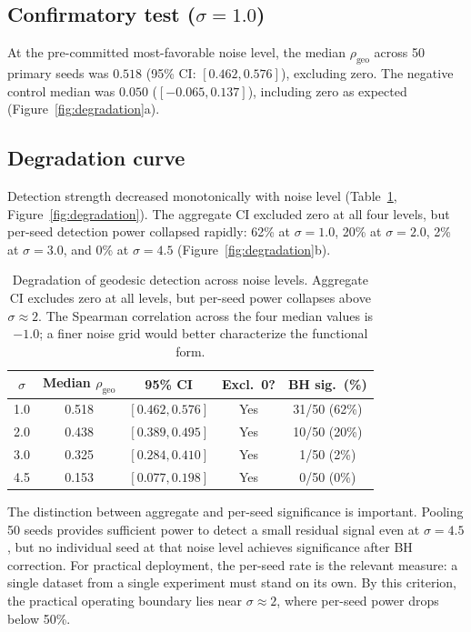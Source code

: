 \documentclass[11pt]{article}
\newcommand{\rhogeo}{\rho_\mathrm{geo}}
\begin{document}
\subsection{Confirmatory test ($\sigma = 1.0$)}

At the pre-committed most-favorable noise level, the median
$\rhogeo$ across 50 primary seeds was $0.518$ (95\% CI: $[0.462,
0.576]$), excluding zero.  The negative control median was $0.050$
($[-0.065, 0.137]$), including zero as expected
(Figure~\ref{fig:degradation}a).

\subsection{Degradation curve}

Detection strength decreased monotonically with noise level
(Table~\ref{tab:degradation}, Figure~\ref{fig:degradation}).  The
aggregate CI excluded zero at all four levels, but per-seed
detection power collapsed rapidly: 62\% at $\sigma = 1.0$, 20\%
at $\sigma = 2.0$, 2\% at $\sigma = 3.0$, and 0\% at
$\sigma = 4.5$ (Figure~\ref{fig:degradation}b).

\begin{table}[t]
\centering
\caption{Degradation of geodesic detection across noise levels.
  Aggregate CI excludes zero at all levels, but per-seed power
  collapses above $\sigma \approx 2$.  The Spearman correlation
  across the four median values is $-1.0$; a finer noise grid
  would better characterize the functional form.}
\label{tab:degradation}
\begin{tabular}{@{}ccccc@{}}
\toprule
$\sigma$ & Median $\rhogeo$ & 95\% CI & Excl.\ 0? & BH sig.\ (\%) \\
\midrule
1.0 & 0.518 & $[0.462, 0.576]$ & Yes & 31/50 (62\%) \\
2.0 & 0.438 & $[0.389, 0.495]$ & Yes & 10/50 (20\%) \\
3.0 & 0.325 & $[0.284, 0.410]$ & Yes & \phantom{0}1/50 \phantom{0}(2\%) \\
4.5 & 0.153 & $[0.077, 0.198]$ & Yes & \phantom{0}0/50 \phantom{0}(0\%) \\
\bottomrule
\end{tabular}
\end{table}

The distinction between aggregate and per-seed significance is
important.  Pooling 50 seeds provides sufficient power to detect a
small residual signal even at $\sigma = 4.5$, but no individual
seed at that noise level achieves significance after BH correction.
For practical deployment, the per-seed rate is the relevant measure:
a single dataset from a single experiment must stand on its own.
By this criterion, the practical operating boundary lies near
$\sigma \approx 2$, where per-seed power drops below 50\%.
\end{document}
